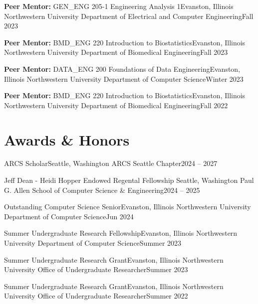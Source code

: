 \documentclass{resume}
\begin{document}
    \resumeSubheading
      {\textbf{Peer Mentor:} GEN\_ENG 205-1 Engineering Analysis 1}{Evanston, Illinois}
      {Northwestern University Department of Electrical and Computer Engineering}{Fall 2023}
    
    \resumeSubheading
      {\textbf{Peer Mentor:} BMD\_ENG 220 Introduction to Biostatistics}{Evanston, Illinois}
      {Northwestern University Department of Biomedical Engineering}{Fall 2023}
    
    \resumeSubheading
      {\textbf{Peer Mentor:} DATA\_ENG 200 Foundations of Data Engineering}{Evanston, Illinois}
      {Northwestern University Department of Computer Science}{Winter 2023}
    
    \resumeSubheading
      {\textbf{Peer Mentor:} BMD\_ENG 220 Introduction to Biostatistics}{Evanston, Illinois}
      {Northwestern University Department of Biomedical Engineering}{Fall 2022}
    
  \resumeSubHeadingListEnd



\section{Awards \& Honors}
  \vspace{3pt}
  \resumeSubHeadingListStart

    \resumeSubheading
      {ARCS Scholar}{Seattle, Washington}
      {ARCS Seattle Chapter}{2024 – 2027}
    
    \resumeSubheading
      {Jeff Dean - Heidi Hopper Endowed Regental Fellowship }{Seattle, Washington}
      {Paul G. Allen School of Computer Science \& Engineering}{2024 – 2025}
    
    \resumeSubheading
      {Outstanding Computer Science Senior}{Evanston, Illinois}
      {Northwestern University Department of Computer Science}{Jun 2024}
    
    \resumeSubheading
      {Summer Undergraduate Research Fellowship}{Evanston, Illinois}
      {Northwestern University Department of Computer Science}{Summer 2023}

    \resumeSubheading
      {Summer Undergraduate Research Grant}{Evanston, Illinois}
      {Northwestern University Office of Undergraduate Researcher}{Summer 2023}
    
    \resumeSubheading
      {Summer Undergraduate Research Grant}{Evanston, Illinois}
      {Northwestern University Office of Undergraduate Researcher}{Summer 2022}
    
\end{document}
